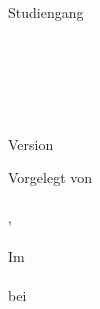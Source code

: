 %
%

\begin{titlepage}
\cfgUniversityName\\
\cfgUniversityDepartment\\
Studiengang \cfgUniversityDegreeCourse\\
\\
\cfgDocClassification\\
\cfgCourseName\\

	\begin{center}
		\Huge
		\cfgDocTitle\\
		\vspace{10mm}
		\Large
		\cfgDocSubTitle\\
		\vspace{15mm}
		\normalsize
		Version \cfgDocVersion
	\end{center}

	\vfill
	Vorgelegt von\\
	\vspace{3mm} \ \\
	\cfgAuthorName, \cfgAuthorMatriculationNum\\
	\cfgAuthorContact\\
	Im \cfgSemesterName\\
	\vspace{3mm} \ \\
	bei \cfgUniversitySupervisorName\\

\end{titlepage}
